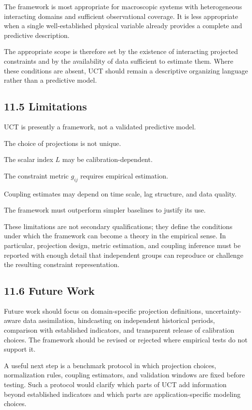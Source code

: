 \documentclass[aps,pre,reprint,superscriptaddress,nofootinbib]{revtex4-2}
\begin{document}
The framework is most appropriate for macroscopic systems with heterogeneous interacting domains and sufficient observational coverage. It is less appropriate when a single well-established physical variable already provides a complete and predictive description.

The appropriate scope is therefore set by the existence of interacting projected constraints and by the availability of data sufficient to estimate them. Where these conditions are absent, UCT should remain a descriptive organizing language rather than a predictive model.

\subsection{11.5 Limitations}

UCT is presently a framework, not a validated predictive model.

The choice of projections is not unique.

The scalar index \(L\) may be calibration-dependent.

The constraint metric \(g_{ij}\) requires empirical estimation.

Coupling estimates may depend on time scale, lag structure, and data quality.

The framework must outperform simpler baselines to justify its use.

These limitations are not secondary qualifications; they define the conditions under which the framework can become a theory in the empirical sense. In particular, projection design, metric estimation, and coupling inference must be reported with enough detail that independent groups can reproduce or challenge the resulting constraint representation.

\subsection{11.6 Future Work}

Future work should focus on domain-specific projection definitions, uncertainty-aware data assimilation, hindcasting on independent historical periods, comparison with established indicators, and transparent release of calibration choices. The framework should be revised or rejected where empirical tests do not support it.

A useful next step is a benchmark protocol in which projection choices, normalization rules, coupling estimators, and validation windows are fixed before testing. Such a protocol would clarify which parts of UCT add information beyond established indicators and which parts are application-specific modeling choices.
\end{document}
